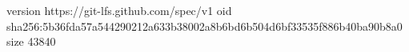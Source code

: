 version https://git-lfs.github.com/spec/v1
oid sha256:5b36fda57a544290212a633b38002a8b6bd6b504d6bf33535f886b40ba90b8a0
size 43840
